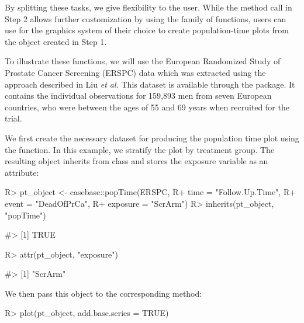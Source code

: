 \documentclass[
]{jss}
\begin{document}
By splitting these tasks, we give flexibility to the user. While the
method call in Step 2 allows further customization by using the
 \citep{ggplot2} family of functions, users can use for the
graphics system of their choice to create population-time plots from the
object created in Step 1.

To illustrate these functions, we will use the European Randomized Study
of Prostate Cancer Screening (ERSPC) data \citep{schroder2009screening}
which was extracted using the approach described in Liu \emph{et al.}
\citeyearpar{liu2014recovering} This dataset is available through the
 package. It contains the individual observations for
159,893 men from seven European countries, who were between the ages of
55 and 69 years when recruited for the trial.

We first create the necessary dataset for producing the population time
plot using the  function. In this example, we stratify the
plot by treatment group. The resulting object inherits from class
 and stores the exposure variable as an attribute:

\begin{CodeChunk}

\begin{CodeInput}
R> pt_object <- casebase::popTime(ERSPC, 
R+                                time = "Follow.Up.Time",
R+                                event = "DeadOfPrCa",
R+                                exposure = "ScrArm")
R> inherits(pt_object, "popTime")
\end{CodeInput}

\begin{CodeOutput}
#> [1] TRUE
\end{CodeOutput}

\begin{CodeInput}
R> attr(pt_object, "exposure")
\end{CodeInput}

\begin{CodeOutput}
#> [1] "ScrArm"
\end{CodeOutput}
\end{CodeChunk}

We then pass this object to the corresponding  method:

\begin{CodeChunk}

\begin{CodeInput}
R> plot(pt_object, add.base.series = TRUE)
\end{CodeInput}
\end{CodeChunk}
\end{document}

